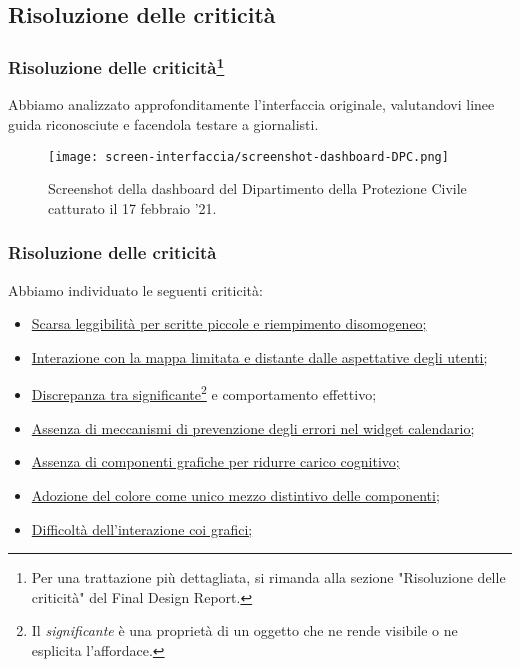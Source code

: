 \subsection{Risoluzione delle criticità}


\begin{frame}
    \frametitle{Risoluzione delle criticità\footnote{Per una trattazione più dettagliata, si rimanda alla sezione "Risoluzione delle criticità" del Final Design Report.}}
    Abbiamo analizzato approfonditamente l'interfaccia originale, valutandovi linee guida riconosciute e facendola testare a giornalisti. 
    \begin{figure}
        \centering
        \texttt{[image: screen-interfaccia/screenshot-dashboard-DPC.png]}
        \caption{Screenshot della dashboard del Dipartimento della Protezione Civile catturato il 17 febbraio '21.}
    \end{figure}
\end{frame}

\begin{frame}
    \frametitle{Risoluzione delle criticità}
    Abbiamo individuato le seguenti criticità: 
    \begin{itemize}
        \item<1-> \hyperlink{f:scarsa-leggibilita}{Scarsa leggibilità per scritte piccole e riempimento disomogeneo;}        
        \item<2-> \hyperlink{f:mappa}{Interazione con la mappa limitata e distante dalle aspettative degli utenti;}
        \item<3-> \hyperlink{f:significante}{Discrepanza tra significante\footnote{Il \textit{significante} è una proprietà di un oggetto che ne rende visibile o ne esplicita l'affordace.} e comportamento effettivo;}
        \item<4-> \hyperlink{f:errori}{Assenza di meccanismi di prevenzione degli errori nel widget calendario;}
        \item<5-> \hyperlink{f:grafica}{Assenza di componenti grafiche per ridurre carico cognitivo;}
        \item<6-> \hyperlink{f:colore}{Adozione del colore come unico mezzo distintivo delle componenti;}
        \item<7-> \hyperlink{f:difficolta}{Difficoltà dell'interazione coi grafici;}
    \end{itemize}    

\end{frame}

